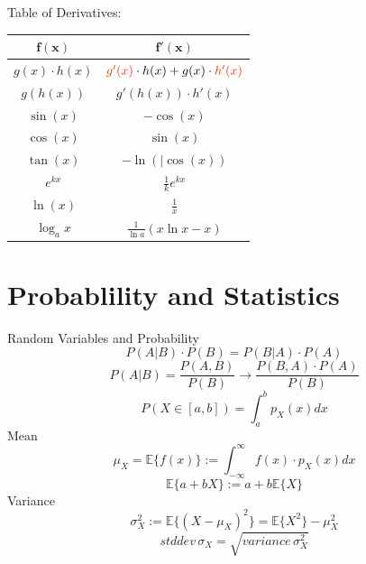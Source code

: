 Table of Derivatives:
\begin{center}
\begin{tabular}{|c|c|}
	\hline 
	\textbf{$\mathbf{f(x)}$} & \textbf{$\mathbf{f'(x)}$} \\ 
	\hline 
	$ g(x) \cdot h(x)$& ${\color{red}g'(x)} \cdot h(x) + g(x) \cdot {\color{red}h'(x)}$ \\ 
	\hline 
	$ g(h(x))$ & $g'(h(x)) \cdot h'(x)$ \\ 
	\hline 
	$\sin(x)$ & $-\cos(x)$ \\ 
	\hline 
	$\cos(x)$ & $\sin(x)$ \\ 
	\hline 
	$\tan(x)$& $-\ln(\vert\cos(x))$ \\ 
	\hline 
	$e^{kx}$& $\frac{1}{k}e^{kx} $\\ 
	\hline 
	$\ln(x)$& $\frac{1}{x}$ \\ 
	\hline 
	$\log_ax$& $\frac{1}{\ln a}(x\ln x -x)$ \\ 
	\hline 
\end{tabular} 
\end{center}
\section*{Probablility and Statistics}
Random Variables and Probability
\begin{equation*}
P(A|B) \cdot  P(B) = P(B|A) \cdot  P(A)
\end{equation*}
\begin{equation*}
P(A|B) = \frac { P(A,B) }{ P(B) }  \rightarrow  \frac { P(B,A) \cdot  P(A) }{ P(B) } 
\end{equation*}
\begin{equation*}
P(X \in  [a,b]) = \int _{ a }^{ b }{  p_{ X }(x) dx } 
\end{equation*}
Mean
\begin{equation*}
\mu_X = \mathbb{ E }\{ f(x)\}  := \int _{ -\infty  }^{ \infty  }{  f(x) \cdot  p_{ X }(x) dx } 
\end{equation*}
\begin{equation*}
\mathbb{ E }\{ a + bX\}  := a + b\mathbb{ E }\{ X\} 
\end{equation*}
Variance
\begin{equation*}
\sigma _{ X }^{ 2 } := \mathbb{ E }\{ (X-\mu _{ X })^{ 2 }\}  = \mathbb{ E }\{ X^{ 2 }\} -\mu _{ X }^{ 2 }
\end{equation*}
\begin{equation*}
std dev \, \sigma _{ X } = \sqrt { variance \, \sigma _{ X }^{ 2 } } 
\end{equation*}
